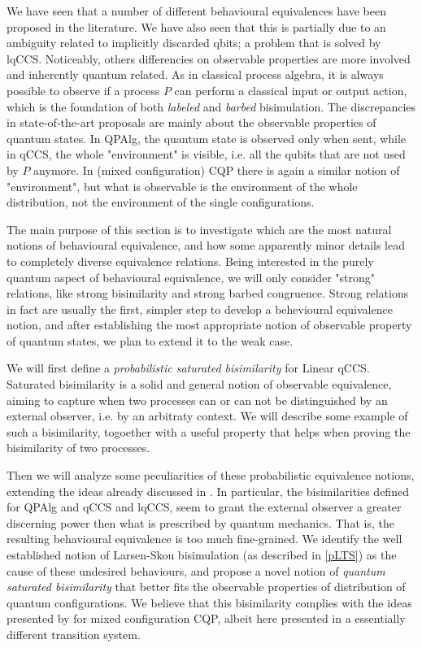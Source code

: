 We have seen that a number of different behavioural equivalences have been proposed in the literature. We have also seen that this is partially due to an ambiguity related to implicitly discarded qbits; a problem that is solved by  lqCCS. Noticeably, others  differencies on observable properties are more involved and inherently quantum related. As in classical process algebra, it is always possible to observe if a process $P$ can perform a classical input or output action, which is the foundation of both \textit{labeled} and \textit{barbed} bisimulation. The discrepancies in state-of-the-art proposals are mainly about the observable properties of quantum states. In QPAlg, the quantum state is observed only when sent, while in qCCS, the whole "environment" is visible, i.e. all the qubits that are not used by $P$ anymore. In (mixed configuration) CQP there is again a similar notion of "environment", but what is observable is the environment of the whole distribution, not the environment of the single configurations.

The main purpose of this section is to investigate which are the most natural notions of behavioural equivalence, and how some apparently minor details lead to completely diverse equivalence relations. Being interested in the purely quantum aspect of behavioural equivalence, we will only consider "strong" relations, like strong bisimilarity and strong barbed congruence. Strong relations in fact are usually the first, simpler step to develop a behevioural equivalence notion, and after establishing the most appropriate notion of observable property of quantum states, we plan to extend it to the weak case.

We will first define a \textit{probabilistic saturated bisimilarity} \cite{bonchiGeneralTheoryBarbs2014} for Linear qCCS. Saturated bisimilarity is a solid and general notion of observable equivalence, aiming to capture when two processes can or can not be distinguished by an external observer, i.e. by an arbitraty context. We will describe some example of such a bisimilarity, togoether with a useful property that helps when proving the bisimilarity of two processes.

Then we will analyze some peculiarities of these probabilistic equivalence notions, extending the ideas already discussed in \cite{davidsonFormalVerificationTechniques2012}. In particular, the bisimilarities defined for QPAlg and qCCS and lqCCS, seem to grant the external observer a greater discerning power then what is prescribed by quantum mechanics. That is, the resulting behavioural equivalence is too much  fine-grained. We identify the well established notion of Larsen-Skou bisimulation (as described in \ref{pLTS}) as the cause of these undesired behaviours, and propose a novel notion of \textit{quantum saturated bisimilarity} that better fits the observable properties of distribution of quantum configurations. We believe that this bisimilarity complies with the ideas presented by \cite{davidsonFormalVerificationTechniques2012} for mixed configuration CQP, albeit here presented in a essentially different transition system.

